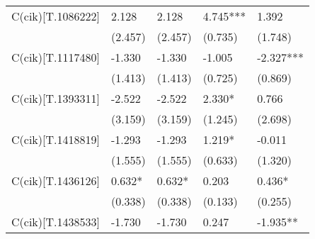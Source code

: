 \begin{table}
\begin{center}
\begin{tabular}{lllll}
C(cik)[T.1086222] & 2.128                                     & 2.128                                           & 4.745***                                & 1.392                                                  \\
                  & (2.457)                                   & (2.457)                                         & (0.735)                                 & (1.748)                                                \\
C(cik)[T.1117480] & -1.330                                    & -1.330                                          & -1.005                                  & -2.327***                                              \\
                  & (1.413)                                   & (1.413)                                         & (0.725)                                 & (0.869)                                                \\
C(cik)[T.1393311] & -2.522                                    & -2.522                                          & 2.330*                                  & 0.766                                                  \\
                  & (3.159)                                   & (3.159)                                         & (1.245)                                 & (2.698)                                                \\
C(cik)[T.1418819] & -1.293                                    & -1.293                                          & 1.219*                                  & -0.011                                                 \\
                  & (1.555)                                   & (1.555)                                         & (0.633)                                 & (1.320)                                                \\
C(cik)[T.1436126] & 0.632*                                    & 0.632*                                          & 0.203                                   & 0.436*                                                 \\
                  & (0.338)                                   & (0.338)                                         & (0.133)                                 & (0.255)                                                \\
C(cik)[T.1438533] & -1.730                                    & -1.730                                          & 0.247                                   & -1.935**                                               \\

\end{tabular}
\end{center}
\end{table}
